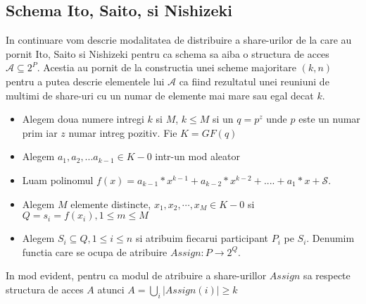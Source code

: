 \documentclass{llncs}
\begin{document}

\subsection{Schema Ito, Saito, si Nishizeki}
\label{Ito}

In continuare vom descrie modalitatea de distribuire a share-urilor de la care au pornit Ito, Saito si Nishizeki pentru ca schema sa aiba o structura de acces $\mathcal{A} \subseteq 2^P$. Acestia au pornit de la constructia unei scheme majoritare $(k, n)$ pentru a putea descrie elementele lui $\mathcal{A}$ ca fiind rezultatul unei reuniuni de multimi de share-uri cu un numar de elemente mai mare sau egal decat $k$.

\begin{itemize}
	\item Alegem doua numere intregi $k$ si $M$, $k \leq M$ si un $q = p^z$ unde $p$ este un numar prim iar $z$ numar intreg pozitiv. Fie $K = GF(q)$
	\item Alegem $a_1, a_2, ...a_{k-1} \in K - {0}$ intr-un mod aleator
	\item Luam polinomul $f(x) = a_{k-1} * x ^ {k-1} + a_{k-2} * x ^ {k - 2} + .... + a_1 * x + \mathcal{S}$.
	\item Alegem $M$ elemente distincte, $x_1, x_2, \cdots, x_M \in K - {0}$ si $Q = {s_i = f(x_i), 1 \leq m \leq M}$
	\item Alegem $S_i \subseteq Q, 1 \leq i \leq n$ si atribuim fiecarui participant $P_i$ pe $S_i$.
	Denumim functia care se ocupa de atribuire $Assign: P \rightarrow 2^Q$. \cite{ITO:1989}
\end{itemize}
In mod evident, pentru ca modul de atribuire a share-urillor $Assign$ sa respecte structura de acces $A$ atunci
$A = { \underset{i}{{\bigcup}} } |Assign(i)| \geq k$
\end{document}
